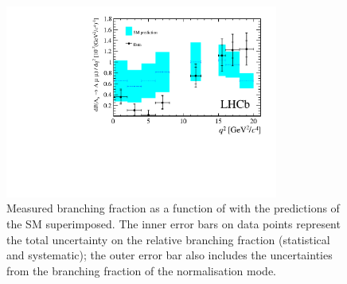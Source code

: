 \begin{figure}
\centering
\includegraphics[width=0.8\textwidth]{Lmumu/figs/paper/figure5.pdf}
\caption{Measured \protect\decay{\Lb}{\Lz\mumu} branching
   fraction as a function of \qsq with the predictions of the SM
   \cite{Detmold:2012vy} superimposed.  The inner error bars on data
   points represent the total uncertainty on the relative branching
   fraction (statistical and systematic); the outer error bar also
   includes the uncertainties from the branching fraction of the
   normalisation mode.}  
\label{fig:Lb_absBR}
\end{figure}

